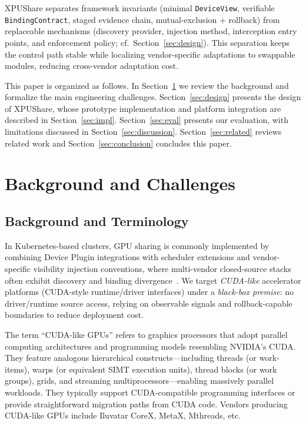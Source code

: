 \documentclass[runningheads,a4paper]{llncs}
\begin{document}
XPUShare separates framework invariants (minimal \texttt{DeviceView},
verifiable \texttt{BindingContract}, staged evidence chain,
mutual-exclusion + rollback) from replaceable mechanisms (discovery
provider, injection method, interception entry points, and enforcement
policy; cf.\ Section~\ref{sec:design}). This separation keeps the
control path stable while localizing vendor-specific adaptations to
swappable modules, reducing cross-vendor adaptation cost.

This paper is organized as follows.
In Section~\ref{sec:background} we review the background and formalize the
main engineering challenges. Section~\ref{sec:design} presents the design of XPUShare, whose prototype
implementation and platform integration are described in Section~\ref{sec:impl}. Section~\ref{sec:eval} presents our evaluation, with limitations discussed in Section~\ref{sec:discussion}. Section~\ref{sec:related} reviews related work and 
Section~\ref{sec:conclusion} concludes this paper.

\section{Background and Challenges}
\label{sec:background}

\subsection{Background and Terminology}

In Kubernetes-based clusters, GPU sharing is commonly
implemented by combining Device Plugin integrations with scheduler
extensions and vendor-specific visibility injection conventions, where
multi-vendor closed-source stacks often exhibit discovery and binding
divergence~\cite{cdi,k8s-device-plugin}. We target \emph{CUDA-like} accelerator platforms (CUDA-style runtime/driver
interfaces) under a \emph{black-box premise}: no driver/runtime source
access, relying on observable signals and rollback-capable boundaries to
reduce deployment cost. 

The term ``CUDA-like GPUs'' refers to graphics processors that adopt parallel computing architectures and programming models resembling NVIDIA's CUDA. They feature analogous hierarchical constructs---including threads (or work-items), warps (or equivalent SIMT execution units), thread blocks (or work groups), grids, and streaming multiprocessors—enabling massively parallel workloads. They typically support CUDA-compatible programming interfaces or provide straightforward migration paths from CUDA code. Vendors producing CUDA-like GPUs include Iluvatar CoreX, MetaX, Mthreads, etc.
\end{document}
